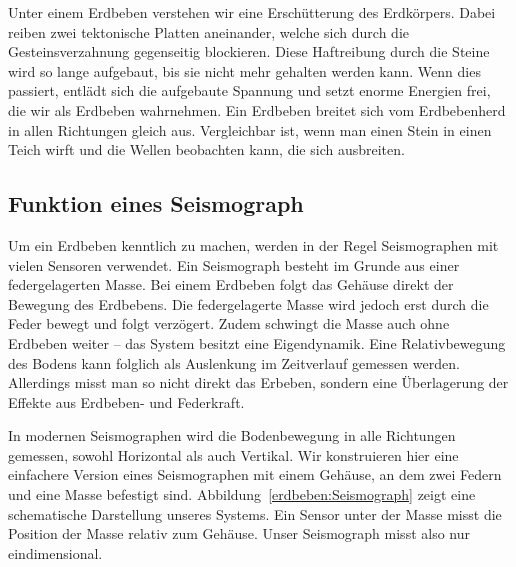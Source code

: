 %
%

\noindent
Unter einem Erdbeben verstehen wir eine Erschütterung des Erdkörpers.
Dabei reiben zwei tektonische Platten aneinander, welche sich durch die Gesteinsverzahnung gegenseitig blockieren.
Diese Haftreibung durch die Steine wird so lange aufgebaut, bis sie nicht mehr gehalten werden kann.
Wenn dies passiert, entlädt sich die aufgebaute Spannung und setzt enorme Energien frei, die wir als Erdbeben wahrnehmen.
Ein Erdbeben breitet sich vom Erdbebenherd in allen Richtungen gleich aus.
Vergleichbar ist, wenn man einen Stein in einen Teich wirft und die Wellen beobachten kann, die sich ausbreiten.

\subsection{Funktion eines Seismograph}
Um ein Erdbeben kenntlich zu machen, werden in der Regel Seismographen mit vielen Sensoren verwendet. 
Ein Seismograph besteht im Grunde aus einer federgelagerten Masse.
Bei einem Erdbeben folgt das Gehäuse direkt der Bewegung des Erdbebens.
Die federgelagerte Masse wird jedoch erst durch die Feder bewegt und folgt verzögert.
Zudem schwingt die Masse auch ohne Erdbeben weiter -- das System besitzt eine Eigendynamik.
Eine Relativbewegung des Bodens kann folglich als Auslenkung im Zeitverlauf gemessen werden.
Allerdings misst man so nicht direkt das Erbeben, sondern eine Überlagerung der Effekte aus Erdbeben- und Federkraft.


In modernen Seismographen wird die Bodenbewegung in alle Richtungen gemessen,
sowohl Horizontal als auch Vertikal. 
Wir konstruieren hier eine einfachere Version eines Seismographen mit einem Gehäuse,
an dem zwei Federn und eine Masse befestigt sind. 
Abbildung~\ref{erdbeben:Seismograph} zeigt eine schematische Darstellung unseres Systems.
Ein Sensor unter der Masse misst die Position der Masse relativ zum Gehäuse.
Unser Seismograph misst also nur eindimensional.


